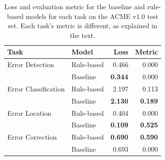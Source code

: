 \documentclass{article}
\begin{document}
\begin{table}
\centering
\begin{tabular}{llrr}
\toprule
Task & Model & Loss & Metric \\
\midrule
Error Detection      & Rule-based &  0.466 &      0.000 \\
                     & Baseline &  \textbf{0.344} &      0.000 \\
                     \midrule
Error Classification & Rule-based &  2.197 &  0.113 \\
                     & Baseline &  \textbf{2.130} &  \textbf{0.189} \\
                     \midrule
Error Location       & Rule-based &  0.404 &      0.000 \\
                     & Baseline &  \textbf{0.109} &  \textbf{0.525} \\
                     \midrule
Error Correction     & Rule-based &  \textbf{0.690} &   \textbf{0.590} \\
                     & Baseline &  0.693 &      0.000 \\
\bottomrule
\end{tabular}
    \caption{Loss and evaluation metric for the baseline and rule-based models for each task on the ACME v1.0 test set. Each task's metric is different, as explained in the text.}
    \label{tab:results}
\end{table}
\end{document}
